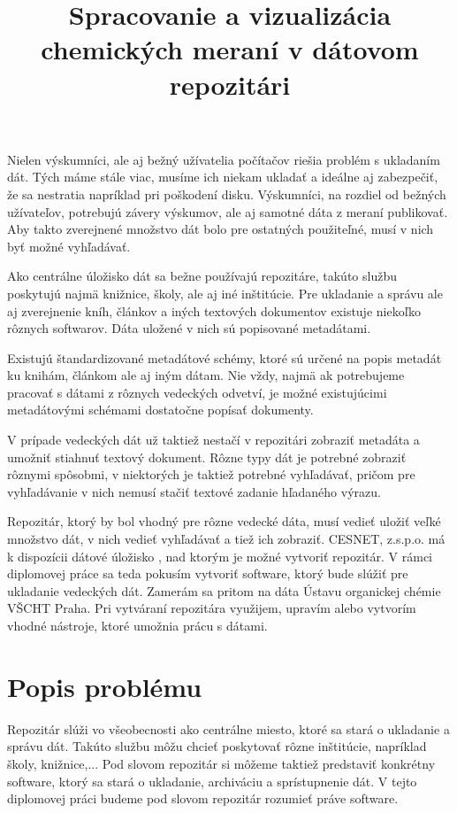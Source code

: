 \documentclass[thesis=M,slovak]{FITthesis}[2013/05/06]
\title{Spracovanie a vizualizácia chemických meraní v dátovom repozitári}
\begin{document}

\begin{introduction}
Nielen výskumníci, ale aj bežný užívatelia počítačov riešia problém s ukladaním dát. Tých máme stále viac, musíme ich niekam ukladať a ideálne aj zabezpečiť, že sa nestratia napríklad pri poškodení disku. Výskumníci, na rozdiel od bežných užívateľov, potrebujú závery výskumov, ale aj samotné dáta z meraní publikovať. Aby takto zverejnené množstvo dát bolo pre ostatných použiteľné, musí v nich byť možné vyhľadávať.

Ako centrálne úložisko dát sa bežne používajú repozitáre, takúto službu poskytujú najmä knižnice, školy, ale aj iné inštitúcie. Pre ukladanie a správu ale aj zverejnenie kníh, článkov a iných textových dokumentov existuje niekoľko rôznych softwarov. Dáta uložené v nich sú popisované metadátami.

Existujú štandardizované metadátové schémy, ktoré sú určené na popis metadát ku knihám, článkom ale aj iným dátam. Nie vždy, najmä ak potrebujeme pracovať s dátami z rôznych vedeckých odvetví, je možné existujúcimi metadátovými schémami dostatočne popísať dokumenty.

V prípade vedeckých dát už taktiež nestačí v repozitári zobraziť metadáta a umožniť stiahnuť textový dokument. Rôzne typy dát je potrebné zobraziť rôznymi spôsobmi, v niektorých je taktiež potrebné vyhľadávať, pričom pre vyhľadávanie v nich nemusí stačiť textové zadanie hľadaného výrazu.

Repozitár, ktorý by bol vhodný pre rôzne vedecké dáta, musí vedieť uložiť veľké množstvo dát, v nich vedieť vyhľadávať a tiež ich zobraziť. CESNET, z.s.p.o. má k dispozícii dátové úložisko \cite{DataCare}, nad ktorým je možné vytvoriť repozitár. V rámci diplomovej práce sa teda pokusím vytvoriť software, ktorý bude slúžiť pre ukladanie vedeckých dát. Zamerám sa pritom na dáta Ústavu organickej chémie VŠCHT Praha. Pri vytváraní repozitára využijem, upravím alebo vytvorím vhodné nástroje, ktoré umožnia prácu s dátami.
\end{introduction}

\chapter{Popis problému}
Repozitár slúži vo všeobecnosti ako centrálne miesto, ktoré sa stará o ukladanie a správu dát. Takúto službu môžu chcieť poskytovať rôzne inštitúcie, napríklad školy, knižnice,... Pod slovom repozitár si môžeme taktiež predstaviť konkrétny software, ktorý sa stará o ukladanie, archiváciu a sprístupnenie dát. V tejto diplomovej práci budeme pod slovom repozitár rozumieť práve software.
\end{document}
